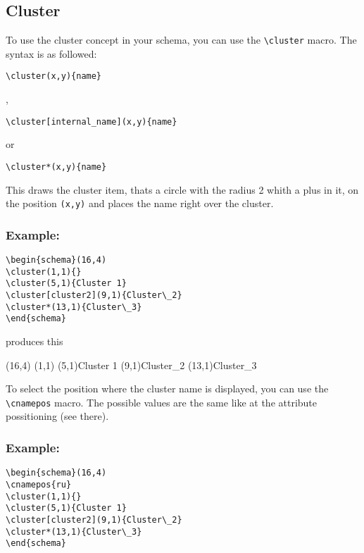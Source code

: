 \documentclass[a4paper,11pt]{article}
\begin{document}
\subsection{Cluster}

To use the cluster concept in your schema, you can use the \verb|\cluster| macro.
The syntax is as followed:

\begin{verbatim}
\cluster(x,y){name}
\end{verbatim}

,

\begin{verbatim}
\cluster[internal_name](x,y){name}
\end{verbatim}

or

\begin{verbatim}
\cluster*(x,y){name}
\end{verbatim}

This draws the cluster item, thats a circle with the radius 2 whith a 
plus in it, on the position {\tt (x,y)} and places the name right over 
the cluster.

\subsubsection*{Example:}

\begin{verbatim}
\begin{schema}(16,4)
\cluster(1,1){}
\cluster(5,1){Cluster 1}
\cluster[cluster2](9,1){Cluster\_2}
\cluster*(13,1){Cluster\_3}
\end{schema}
\end{verbatim}

produces this

\begin{schema}(16,4)
\cluster(1,1){}
\cluster(5,1){Cluster 1}
\cluster[cluster2](9,1){Cluster\_2}
\cluster*(13,1){Cluster\_3}
\end{schema}

To select the position where the cluster name is displayed, you can use the 
\verb|\cnamepos| macro. The possible values are the same like at the attribute 
possitioning (see there).

\subsubsection*{Example:}

\begin{verbatim}
\begin{schema}(16,4)
\cnamepos{ru}
\cluster(1,1){}
\cluster(5,1){Cluster 1}
\cluster[cluster2](9,1){Cluster\_2}
\cluster*(13,1){Cluster\_3}
\end{schema}
\end{verbatim}
\end{document}
